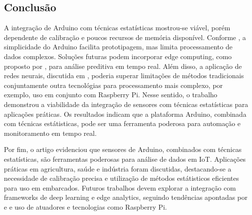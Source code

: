 \documentclass[12pt, a4paper]{article}
\begin{document}
\subsection{Conclusão}
\label{sec:Conclusão}
A integração de Arduino com técnicas estatísticas mostrou-se viável, porém dependente de calibração e
poucos recursos de memória disponível. Conforme \cite{Tasiran2019}, a simplicidade do Arduino facilita prototipagem, mas limita
processamento de dados complexos. Soluções futuras podem incorporar edge computing, como proposto por \cite{Selmy2024},
para análise preditiva em tempo real. Além disso, a aplicação de redes neurais, discutida em \cite{MAHDAVINEJAD2018161},
poderia superar limitações de métodos tradicionais conjuntamente outra tecnológias para processamento mais complexo, por exemplo, uso em conjunto com Raspberry Pi. Nesse sentido, o trabalho demonstrou a viabilidade da integração de sensores com técnicas estatísticas para aplicações práticas. Os resultados indicam que a plataforma Arduino, combinada
com técnicas estátisticas, pode ser uma ferramenta poderosa para automação e monitoramento em tempo real.


Por fim, o artigo evidenciou que sensores de Arduino, combinados com técnicas estatísticas, são ferramentas
poderosas para análise de dados em IoT. Aplicações práticas em agricultura, saúde e indústria foram discutidas,
destacando-se a necessidade de calibração precisa e utilização de métodos estátisticos eficientes para uso em embarcados. Futuros trabalhos
devem explorar a integração com frameworks de deep learning e edge analytics, seguindo tendências apontadas por
\cite{Adi2020} e \cite{Selmy2024} e uso de atuadores e tecnologias como Raspberry Pi. 

\end{document}
